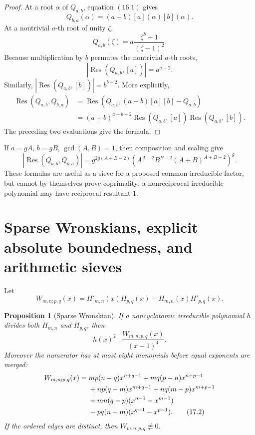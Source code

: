 \documentclass[11pt]{article}
\newtheorem{proposition}[theorem]{Proposition}
\theoremstyle{definition}
\newcommand{\Res}{\operatorname{Res}}
\begin{document}
\begin{proof}
At a root \(\alpha\) of \(Q_{a,b}\), equation \((16.1)\) gives
\[
 Q_{b,a}(\alpha)=(a+b)[a](\alpha)[b](\alpha).
\]
At a nontrivial \(a\)-th root of unity \(\zeta\),
\[
 Q_{a,b}(\zeta)=a\frac{\zeta^b-1}{(\zeta-1)^2}.
\]
Because multiplication by \(b\) permutes the nontrivial \(a\)-th roots,
\[
 |\Res(Q_{a,b},[a])|=a^{a-2}.
\]
Similarly, \(|\Res(Q_{a,b},[b])|=b^{b-2}\).  More explicitly,
\begin{align*}
 \Res(Q_{a,b},Q_{b,a})
 &=\Res\!\left(Q_{a,b},(a+b)[a][b]-Q_{a,b}\right)\\
 &=(a+b)^{a+b-2}
   \Res(Q_{a,b},[a])\Res(Q_{a,b},[b]).
\end{align*}
The preceding two evaluations give the formula.
\end{proof}

If \(a=gA\), \(b=gB\), \(\gcd(A,B)=1\), then composition and scaling give
\begin{equation}
 \left|\Res(Q_{a,b},Q_{b,a})\right|
 =g^{2g(A+B-2)}
 \left(A^{A-2}B^{B-2}(A+B)^{A+B-2}\right)^g.
 \tag{16.3}
\end{equation}
These formulas are useful as a sieve for a proposed common irreducible factor,
but cannot by themselves prove coprimality: a nonreciprocal irreducible
polynomial may have reciprocal resultant \(1\).

\section{Sparse Wronskians, explicit absolute boundedness, and arithmetic sieves}
\label{sec:wronskian}

Let
\[
 W_{m,n;p,q}(x)
 =H'_{m,n}(x)H_{p,q}(x)-H_{m,n}(x)H'_{p,q}(x).
\]

\begin{proposition}[Sparse Wronskian]\label{prop:wronskian}
If a noncyclotomic irreducible polynomial \(h\) divides both
\(H_{m,n}\) and \(H_{p,q}\), then
\begin{equation}
 h(x)^2\mid \frac{W_{m,n;p,q}(x)}{(x-1)^4}.
 \tag{17.1}
\end{equation}
Moreover the numerator has at most eight monomials before equal exponents are
merged:
\begin{align}
 W_{m,n;p,q}(x)={}&mp(n-q)x^{n+q-1}
 +mq(p-n)x^{n+p-1} \notag\\
 &+np(q-m)x^{m+q-1}
 +nq(m-p)x^{m+p-1} \notag\\
 &+mn(q-p)(x^{n-1}-x^{m-1}) \notag\\
 &-pq(n-m)(x^{q-1}-x^{p-1}).
 \tag{17.2}
\end{align}
If the ordered edges are distinct, then \(W_{m,n;p,q}\not\equiv0\).
\end{proposition}
\end{document}
